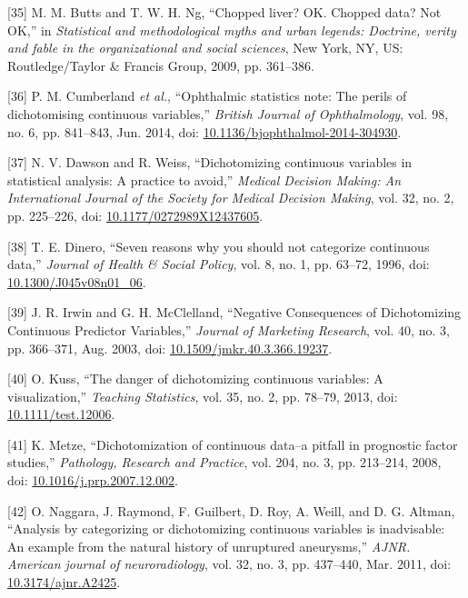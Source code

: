 \documentclass[12pt,twoside]{reedthesis}
\newenvironment{cslreferences}%
  {}%
  {\par}
\begin{document}
\begin{cslreferences}
\leavevmode\hypertarget{ref-butts_chopped_2009-1}{}%
{[}35{]} M. M. Butts and T. W. H. Ng, ``Chopped liver? OK. Chopped data? Not OK,'' in \emph{Statistical and methodological myths and urban legends: Doctrine, verity and fable in the organizational and social sciences}, New York, NY, US: Routledge/Taylor \& Francis Group, 2009, pp. 361--386.

\leavevmode\hypertarget{ref-cumberland_ophthalmic_2014-1}{}%
{[}36{]} P. M. Cumberland \emph{et al.}, ``Ophthalmic statistics note: The perils of dichotomising continuous variables,'' \emph{British Journal of Ophthalmology}, vol. 98, no. 6, pp. 841--843, Jun. 2014, doi: \href{https://doi.org/10.1136/bjophthalmol-2014-304930}{10.1136/bjophthalmol-2014-304930}.

\leavevmode\hypertarget{ref-dawson_dichotomizing_2012-1}{}%
{[}37{]} N. V. Dawson and R. Weiss, ``Dichotomizing continuous variables in statistical analysis: A practice to avoid,'' \emph{Medical Decision Making: An International Journal of the Society for Medical Decision Making}, vol. 32, no. 2, pp. 225--226, doi: \href{https://doi.org/10.1177/0272989X12437605}{10.1177/0272989X12437605}.

\leavevmode\hypertarget{ref-dinero_seven_1996-1}{}%
{[}38{]} T. E. Dinero, ``Seven reasons why you should not categorize continuous data,'' \emph{Journal of Health \& Social Policy}, vol. 8, no. 1, pp. 63--72, 1996, doi: \href{https://doi.org/10.1300/J045v08n01_06}{10.1300/J045v08n01\_06}.

\leavevmode\hypertarget{ref-irwin_negative_2003}{}%
{[}39{]} J. R. Irwin and G. H. McClelland, ``Negative Consequences of Dichotomizing Continuous Predictor Variables,'' \emph{Journal of Marketing Research}, vol. 40, no. 3, pp. 366--371, Aug. 2003, doi: \href{https://doi.org/10.1509/jmkr.40.3.366.19237}{10.1509/jmkr.40.3.366.19237}.

\leavevmode\hypertarget{ref-kuss_danger_2013}{}%
{[}40{]} O. Kuss, ``The danger of dichotomizing continuous variables: A visualization,'' \emph{Teaching Statistics}, vol. 35, no. 2, pp. 78--79, 2013, doi: \href{https://doi.org/10.1111/test.12006}{10.1111/test.12006}.

\leavevmode\hypertarget{ref-metze_dichotomization_2008}{}%
{[}41{]} K. Metze, ``Dichotomization of continuous data--a pitfall in prognostic factor studies,'' \emph{Pathology, Research and Practice}, vol. 204, no. 3, pp. 213--214, 2008, doi: \href{https://doi.org/10.1016/j.prp.2007.12.002}{10.1016/j.prp.2007.12.002}.

\leavevmode\hypertarget{ref-naggara_analysis_2011}{}%
{[}42{]} O. Naggara, J. Raymond, F. Guilbert, D. Roy, A. Weill, and D. G. Altman, ``Analysis by categorizing or dichotomizing continuous variables is inadvisable: An example from the natural history of unruptured aneurysms,'' \emph{AJNR. American journal of neuroradiology}, vol. 32, no. 3, pp. 437--440, Mar. 2011, doi: \href{https://doi.org/10.3174/ajnr.A2425}{10.3174/ajnr.A2425}.


\end{cslreferences}
\end{document}
